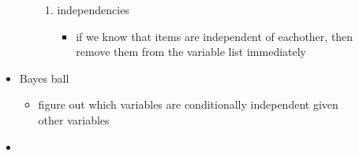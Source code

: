 \documentclass[11pt]{article}
\begin{document}
\begin{description}
\begin{itemize}
\begin{itemize}
\begin{enumerate}
			\item independencies
			\begin{itemize}
				\item if we know that items are independent of eachother, then remove them from the variable list immediately
				
			\end{itemize}
	
		\end{enumerate}
	\end{itemize}

	\item Bayes ball
	\begin{itemize}
		\item figure out which variables are conditionally independent given other variables
	\end{itemize}

	\item 
\end{itemize}



\end{description}
\end{document}
